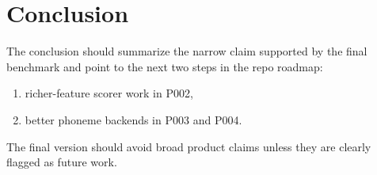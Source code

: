 \section{Conclusion}

The conclusion should summarize the narrow claim supported by the final
benchmark and point to the next two steps in the repo roadmap:

\begin{enumerate}
  \item richer-feature scorer work in P002,
  \item better phoneme backends in P003 and P004.
\end{enumerate}

The final version should avoid broad product claims unless they are clearly
flagged as future work.
